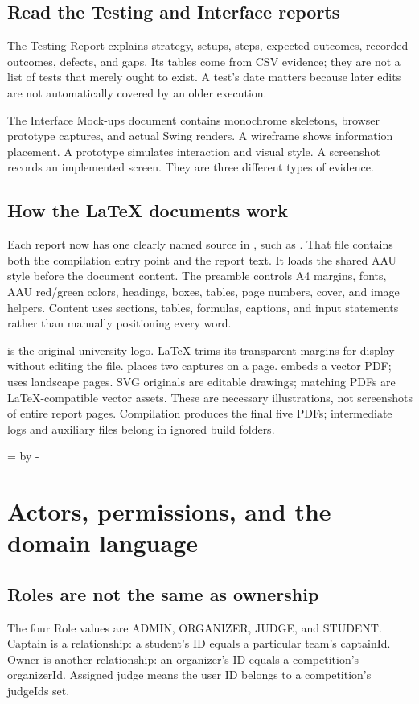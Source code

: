 \documentclass[12pt]{article}
\newcommand{\topic}[1]{\needroom{9\baselineskip}\section{#1}}
\newcommand{\needroom}[1]{\par\begingroup\dimen0=\pagegoal\advance\dimen0 by -\pagetotal\ifdim\dimen0<#1\newpage\fi\endgroup}
\begin{document}
\subsection{Read the Testing and Interface reports}
The Testing Report explains strategy, setups, steps, expected outcomes, recorded outcomes, defects, and gaps. Its tables come from CSV evidence; they are not a list of tests that merely ought to exist. A test's date matters because later edits are not automatically covered by an older execution.

The Interface Mock-ups document contains monochrome skeletons, browser prototype captures, and actual Swing renders. A wireframe shows information placement. A prototype simulates interaction and visual style. A screenshot records an implemented screen. They are three different types of evidence.

\subsection{How the LaTeX documents work}
Each report now has one clearly named source in , such as . That file contains both the compilation entry point and the report text. It loads the shared AAU style before the document content. The preamble controls A4 margins, fonts, AAU red/green colors, headings, boxes, tables, page numbers, cover, and image helpers. Content uses sections, tables, formulas, captions, and input statements rather than manually positioning every word.

 is the original university logo. LaTeX trims its transparent margins for display without editing the file.  places two captures on a page.  embeds a vector PDF;  uses landscape pages. SVG originals are editable drawings; matching PDFs are LaTeX-compatible vector assets. These are necessary illustrations, not screenshots of entire report pages. Compilation produces the final five PDFs; intermediate logs and auxiliary files belong in ignored build folders.

\topic{Actors, permissions, and the domain language}
\subsection{Roles are not the same as ownership}
The four Role values are ADMIN, ORGANIZER, JUDGE, and STUDENT. Captain is a relationship: a student's ID equals a particular team's captainId. Owner is another relationship: an organizer's ID equals a competition's organizerId. Assigned judge means the user ID belongs to a competition's judgeIds set.
\end{document}
